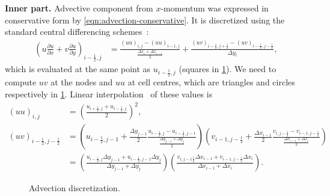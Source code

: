 \documentclass{article}
\begin{document}
\textbf{Inner part.} 
Advective component from $x$-momentum was expressed in conservative form by \cref{eqn:advection-conservative}. It is discretized using the standard central differencing schemes~\cite{Colonius:2008}:
\begin{align}\label{eqn:adv-inner}
	\left (u\frac{\partial u}{\partial x}+v \frac{\partial u}{\partial y}\right)_{i-\frac{1}{2},j}&=\frac{(uu)_{i
	,j}-(uu)_{i- 1,j}}{\frac{\Delta x_i+\Delta x_{i-1}}{2}}+\frac{(uv)_{i-\frac{1}{2},j+\frac{1}{2}}-(uv)_{i-\frac{1}{2},j-\frac{1}{2}}}{\Delta y_i},
\end{align}
which is evaluated at the same point as $u_{i-\frac{1}{2},j}$ (squares in \cref{fig:ADV}). We need to compute $uv$ at the nodes and $uu$ at cell centres, which are triangles and circles respectively in \cref{fig:ADV}. Linear interpolation~\cite{Colonius:2008} of these values is
\begin{align*}
  (uu)_{i,j}&=\left(\frac{u_{i+\frac{1}{2},j}+u_{i-\frac{1}{2},j}}{2}\right)^2,\\
  (uv)_{i-\frac{1}{2},j-\frac{1}{2}}&=\left(u_{i-\frac{1}{2},j-1} + \frac{\Delta y_{j-1}}{2}\frac{u_{i-\frac{1}{2},j}-u_{i-\frac{1}{2},j-1}}{\frac{\Delta y_{j-1} +\Delta y_j}{2}} \right) \left( v_{i-1,j-\frac{1}{2}} + \frac{\Delta x_{i-1}}{2}\frac{v_{i,j-\frac{1}{2}}-v_{i-1,j-\frac{1}{2}}}{\frac{\Delta x_{i-1} +\Delta x_i}{2}}\right)\\
  &=\left(\frac{u_{i-\frac{1}{2},j}\Delta y_{j-1} +u_{i-\frac{1}{2},j-1}\Delta y_j}{\Delta y_{j-1}+\Delta y_{j}}\right )\left ( \frac{v_{i,j-1\frac{1}{2}}\Delta x_{i-1} +v_{i-1,j-\frac{1}{2}}\Delta x_i}{\Delta x_{i-1}+\Delta x_{i}}\right).
\end{align*}

\begin{figure}[H] %
  \caption{Advection discretization.}\label{fig:ADV}
\end{figure}
\end{document}
